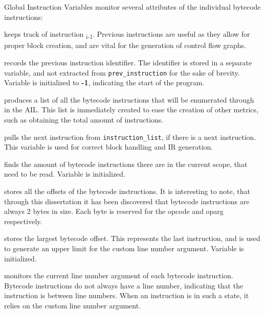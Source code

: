             \begin{description}
                \item Global Instruction Variables monitor several attributes of the individual bytecode instructions:
                \item[prev\_instruction] keeps track of instruction \textsubscript{i-1}. Previous instructions are useful as they allow for proper block creation, and are vital for the generation of control flow graphs.
                \item[prev\_instruction\_identifier] records the previous instruction identifier. The identifier is stored in a separate variable, and not extracted from \lstinline|prev_instruction| for the sake of brevity. Variable is initialized to {\bfseries-1}, indicating the start of the program.
                \item[instruction\_list] produces a list of all the bytecode instructions that will be enumerated through in the \acs{AIL}. This list is immediately created to ease the creation of other metrics, such as obtaining the total amount of instructions. 
                \item[next\_instruction] pulls the next instruction from \lstinline|instruction_list|, if there is a next instruction. This variable is used for correct block handling and \acs{IR} generation.
                \item[instruction\_size] finds the amount of bytecode instructions there are in the current scope, that need to be read. Variable is initialized.
                \item[instructions\_offset\_list] stores all the offsets of the bytecode instructions. It is interesting to note, that through this dissertation it has been discovered that bytecode instructions are always 2 bytes in size. Each byte is reserved for the opcode and oparg respectively.
                \item[largest\_bytecode\_offset] stores the largest bytecode offset. This represents the last instruction, and is used to generate an upper limit for the custom line number argument. Variable is initialized.
                \item[line\_number] monitors the current line number argument of each bytecode instruction. Bytecode instructions do not always have a line number, indicating that the instruction is between line numbers. When an instruction is in such a state, it relies on the custom line number argument. %
            \end{description}

